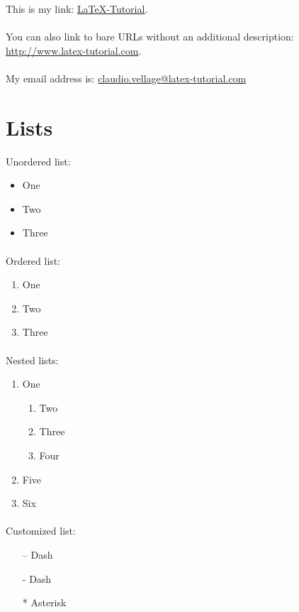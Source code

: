 \documentclass{book}
\begin{document}
This is my link: \href{http://www.latex-tutorial.com}{LaTeX-Tutorial}.

\paragraph{}

You can also link to bare URLs without an additional description: \url{http://www.latex-tutorial.com}.

\paragraph{}

My email address is: \href{mailto:claudio.vellage@latex-tutorial.com}{claudio.vellage@latex-tutorial.com}

\section{Lists}

Unordered list:
\begin{itemize}
	\item One
	\item Two
	\item Three
\end{itemize}

\paragraph{}

Ordered list:
\begin{enumerate}
	\item One
	\item Two
	\item Three
\end{enumerate}

\paragraph{}

Nested lists:

\begin{enumerate}
        \item One
    \begin{enumerate}
        \item Two
        \item Three
        \item Four
    \end{enumerate} 
        \item Five
        \item Six
\end{enumerate}

\paragraph{}

Customized list:

\begin{itemize}\item[--] Dash
    \item[-] Dash
    \item[*] Asterisk
\end{itemize}

\newpage
\cleardoublepage

 

\end{document}
